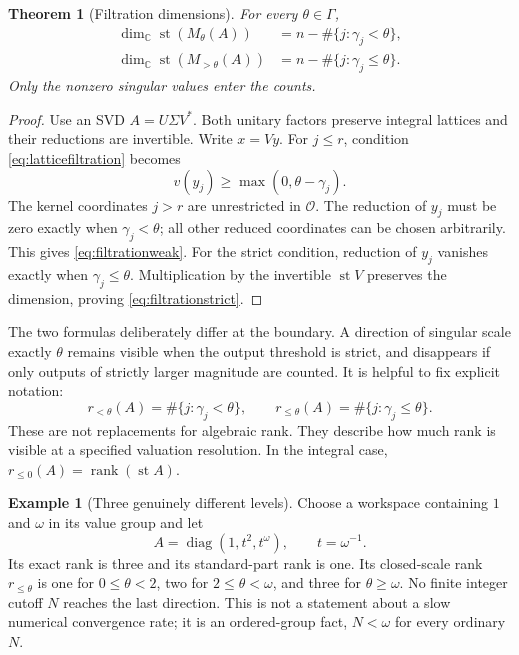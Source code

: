 \documentclass[11pt,a4paper]{article}
\numberwithin{equation}{section}
\newtheorem{theorem}{Theorem}[section]
\theoremstyle{definition}
\newtheorem{example}[example]{Example}
\theoremstyle{remark}
\newcommand{\C}{\mathbb C}
\newcommand{\OO}{\mathcal O}
\newcommand{\st}{\operatorname{st}}
\newcommand{\rank}{\operatorname{rank}}
\newcommand{\diag}{\operatorname{diag}}
\begin{document}
\begin{theorem}[Filtration dimensions]\label{thm:filtration}
For every $\theta\in\Gamma$,
\begin{align}
 \dim_\C\st(M_\theta(A))
   &=n-\#\{j:\gamma_j<\theta\},\label{eq:filtrationweak}\\
 \dim_\C\st(M_{>\theta}(A))
   &=n-\#\{j:\gamma_j\le\theta\}.\label{eq:filtrationstrict}
\end{align}
Only the nonzero singular values enter the counts.
\end{theorem}
\begin{proof}
Use an SVD $A=U\Sigma V^*$. Both unitary factors preserve integral
lattices and their reductions are invertible. Write $x=Vy$. For $j\le r$,
condition \eqref{eq:latticefiltration} becomes
\[
 v(y_j)\ge\max(0,\theta-\gamma_j).
\]
The kernel coordinates $j>r$ are unrestricted in $\OO$. The reduction of
$y_j$ must be zero exactly when $\gamma_j<\theta$; all other reduced
coordinates can be chosen arbitrarily. This gives
\eqref{eq:filtrationweak}. For the strict condition, reduction of $y_j$
vanishes exactly when $\gamma_j\le\theta$. Multiplication by the
invertible $\st V$ preserves the dimension, proving
\eqref{eq:filtrationstrict}.
\end{proof}

The two formulas deliberately differ at the boundary. A direction of
singular scale exactly $\theta$ remains visible when the output threshold
is strict, and disappears if only outputs of strictly larger magnitude are
counted. It is helpful to fix explicit notation:
\[
 r_{<\theta}(A)=\#\{j:\gamma_j<\theta\},\qquad
 r_{\le\theta}(A)=\#\{j:\gamma_j\le\theta\}.
\]
These are not replacements for algebraic rank. They describe how much rank
is visible at a specified valuation resolution. In the integral case,
$r_{\le0}(A)=\rank(\st A)$.

\begin{example}[Three genuinely different levels]\label{ex:three}
Choose a workspace containing $1$ and $\omega$ in its value group and let
\[
 A=\diag(1,t^2,t^\omega),\qquad t=\omega^{-1}.
\]
Its exact rank is three and its standard-part rank is one. Its closed-scale
rank $r_{\le\theta}$ is one for $0\le\theta<2$, two for
$2\le\theta<\omega$, and three for $\theta\ge\omega$.
No finite integer cutoff $N$ reaches the last direction. This is not a
statement about a slow numerical convergence rate; it is an ordered-group
fact, $N<\omega$ for every ordinary $N$.
\end{example}
\end{document}
